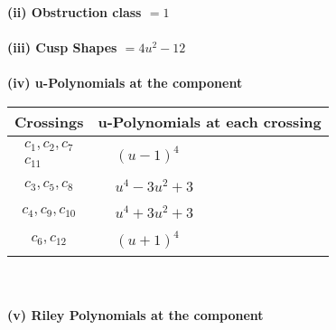 \documentclass[1p]{elsarticle_modified}
\theoremstyle{definition}
\begin{document}
\flushleft \textbf{(ii) Obstruction class $= 1$}\\~\\
\flushleft \textbf{(iii) Cusp Shapes $= 4 u^2-12$}\\~\\
\newpage\renewcommand{\arraystretch}{1}
\flushleft \textbf{(iv) u-Polynomials at the component}\newline \\
\begin{tabular}{m{50pt}|m{274pt}}
Crossings & \hspace{64pt}u-Polynomials at each crossing \\
\hline $$\begin{aligned}c_{1},c_{2},c_{7}\\c_{11}\end{aligned}$$&$\begin{aligned}
&(u-1)^4
\end{aligned}$\\
\hline $$\begin{aligned}c_{3},c_{5},c_{8}\end{aligned}$$&$\begin{aligned}
&u^4-3 u^2+3
\end{aligned}$\\
\hline $$\begin{aligned}c_{4},c_{9},c_{10}\end{aligned}$$&$\begin{aligned}
&u^4+3 u^2+3
\end{aligned}$\\
\hline $$\begin{aligned}c_{6},c_{12}\end{aligned}$$&$\begin{aligned}
&(u+1)^4
\end{aligned}$\\
\hline
\end{tabular}\\~\\
\newpage\renewcommand{\arraystretch}{1}
\flushleft \textbf{(v) Riley Polynomials at the component}\newline \\
\end{document}
